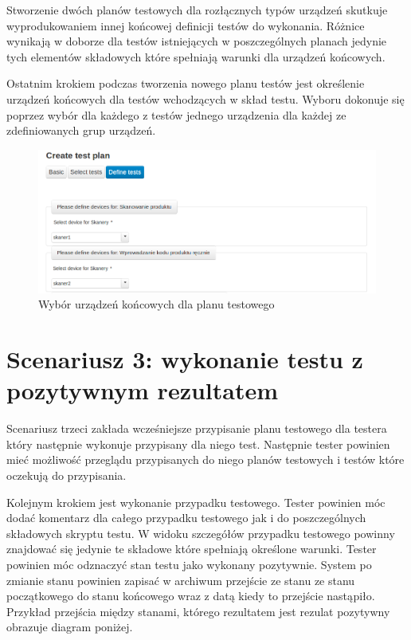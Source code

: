 Stworzenie dwóch planów testowych dla rozłącznych typów urządzeń skutkuje wyprodukowaniem innej końcowej definicji testów do wykonania. Różnice wynikają w doborze dla testów istniejących w poszczególnych planach jedynie tych elementów składowych które spełniają warunki dla urządzeń końcowych.

Ostatnim krokiem podczas tworzenia nowego planu testów jest określenie urządzeń końcowych dla testów wchodzących w skład testu. Wyboru dokonuje się poprzez wybór dla każdego z testów jednego urządzenia dla każdej ze zdefiniowanych grup urządzeń.

  \begin{figure}[h]
  \begin{center}
    \includegraphics[scale=0.4]{img/screen/tworzeniePlanuWyborUrzadzen.png}
    \caption{Wybór urządzeń końcowych dla planu testowego}
    \label{fig:wyborUrzadzenDlaPlanu}
  \end{center}
\end{figure}

\section{Scenariusz 3: wykonanie testu z pozytywnym rezultatem}

Scenariusz trzeci zakłada wcześniejsze przypisanie planu testowego dla testera który następnie wykonuje przypisany dla niego test. Następnie tester powinien mieć możliwość przeglądu przypisanych do niego planów testowych i testów które oczekują do przypisania.

Kolejnym krokiem jest wykonanie przypadku testowego. Tester powinien móc dodać komentarz dla całego przypadku testowego jak i do poszczególnych składowych skryptu testu. W widoku szczegółów przypadku testowego powinny znajdować się jedynie te składowe które spełniają określone warunki. Tester powinien móc odznaczyć stan testu jako wykonany pozytywnie. System po zmianie stanu powinien zapisać w archiwum przejście ze stanu ze stanu początkowego do stanu końcowego wraz z datą kiedy to przejście nastąpiło. Przykład przejścia między stanami, którego rezultatem jest rezulat pozytywny obrazuje diagram poniżej.

